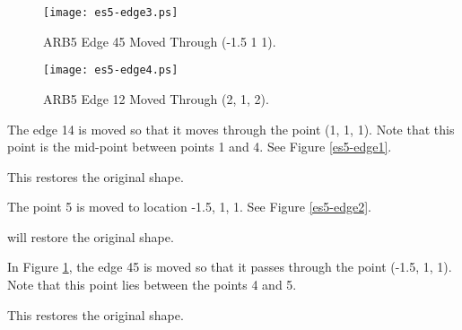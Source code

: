 \begin{figure}
\centering \texttt{[image: es5-edge3.ps]}
\caption{ARB5 Edge 45 Moved Through (-1.5 1 1).}
\label{es5-edge3}
\end{figure}

\begin{figure}
\centering \texttt{[image: es5-edge4.ps]}
\caption{ARB5 Edge 12 Moved Through (2, 1, 2).}
\label{es5-edge4}
\end{figure}


The edge 14 is moved so that it moves through the point (1, 1, 1).
Note that this point is the mid-point between points 1 and 4.
See Figure \ref{es5-edge1}.


This restores the original shape.


The point 5 is moved to location -1.5, 1, 1.  See Figure \ref{es5-edge2}.


will restore the original shape.


In Figure \ref{es5-edge3}, the edge 45 is moved
so that it passes through the point (-1.5, 1, 1).
Note that this point lies between the points 4 and 5.


This restores the original shape.


